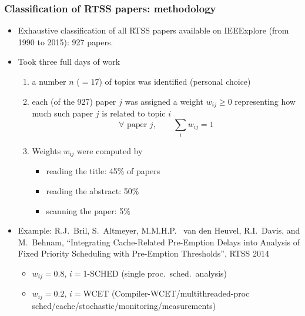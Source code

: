 \documentclass[ignorenonframetext,mathserif]{beamer} %
\begin{document}
\begin{frame}
  \frametitle{Classification of RTSS papers: methodology}
  
  \begin{itemize}
  \item Exhaustive classification of all RTSS papers available on
    IEEExplore (from 1990 to 2015): 927 papers.  
  \item Took three full days of work
    \begin{enumerate}
    \item a number $n$ ($=17$) of topics was identified (personal
      choice)
    \item each (of the 927) paper $j$ was assigned a weight
      $w_{ij}\geq 0$ representing how much such paper $j$ is related
      to topic $i$
      \[
      \forall \text{ paper } j,\qquad\sum_i w_{ij}= 1
      \]
    \item Weights $w_{ij}$ were computed by
      \begin{itemize}
      \item reading the title: 45\% of papers
      \item reading the abstract: 50\%
      \item scanning the paper: 5\%
      \end{itemize}
    \end{enumerate}
  \item Example: R.J.~Bril, S.~Altmeyer, M.M.H.P.~ van den Heuvel,
    R.I.~Davis, and M.~Behnam, ``Integrating Cache-Related Pre-Emption
    Delays into Analysis of Fixed Priority Scheduling with Pre-Emption
    Thresholds'', RTSS 2014
    \begin{itemize}
    \item $w_{ij}=0.8$, $i=$1-SCHED (single proc.~sched.~analysis)
    \item $w_{ij}=0.2$, $i=$WCET (Compiler-WCET/multithreaded-proc
      sched/cache/stochastic/monitoring/measurements)
    \end{itemize}
  \end{itemize}
\end{frame}
\end{document}
